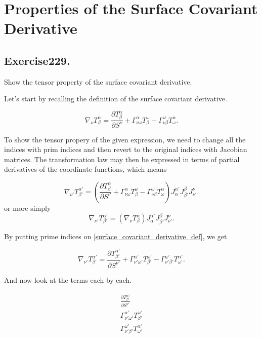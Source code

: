 \documentclass[../main.tex]{subfiles}
\begin{document}
\section{Properties of the Surface Covariant Derivative}

\subsection{Exercise229. }Show the tensor property of the surface covariant derivative.

\sol

Let's start by recalling the definition of the surface covariant derivative.

\begin{equation}
    \nabla_\nu{T^\alpha_\beta}
    =\frac{\partial T^\alpha_\beta}{\partial S^\nu}
    +\Gamma^\alpha_{\nu\omega}T^\omega_\beta
    -\Gamma^\omega_{\nu\beta}T^\alpha_\omega.
    \label{surface_covariant_derivative_def}
\end{equation}

To show the tensor propery of the given expression, we need to change all the indices with prim indices and then revert to the original indices with Jacobian matrices.
The transformation law may then be expressed in terms of partial derivatives of the coordinate functions, which means


$$
    \nabla_{\nu'}{T^{\alpha'}_{\beta'}}
    =\left( \frac{\partial T^\alpha_\beta}{\partial S^\nu}
    +\Gamma^\alpha_{\nu\omega}T^\omega_\beta
    -\Gamma^\omega_{\nu\beta}T^\alpha_\omega\right) 
    J^{{\alpha}'}_{\alpha}J^\beta_{{\beta}'}J^\nu_{{\nu}'}.
$$
or more simply
\begin{equation}
    \nabla_{\nu'}{T^{\alpha'}_{\beta'}
    }=\left( \nabla_{\nu}{T^{\alpha}_{\beta}} \right) 
    J^{{\alpha}'}_{\alpha}J^\beta_{{\beta}'}J^\nu_{{\nu}'}.
\end{equation}

By putting prime indices on \ref{surface_covariant_derivative_def}, we get

\begin{equation}
    \nabla_{\nu'}{T^{\alpha'}_{\beta'}}
    =\frac{\partial T^{\alpha'}_{\beta'}}{\partial S^{\nu'}}
    +\Gamma^{\alpha'}_{\nu'\omega'}T^{\omega'}_{\beta'}
    -\Gamma^{\omega'}_{\nu'\beta'}T^{\alpha'}_{\omega'}.
    \label{eqmain}
\end{equation}

And now look at the terms each by each.

\begin{subequations}
\begin{align}
    \frac{\partial T^{\alpha'}_{\beta'}}{\partial S^{\nu'}} \label{eq1}\\
    \Gamma^{\alpha'}_{\nu'\omega'}T^{\omega'}_{\beta'} \label{eq2}\\
    \Gamma^{\omega'}_{\nu'\beta'}T^{\alpha'}_{\omega'} \label{eq3}
\end{align}
\end{subequations}
\end{document}
